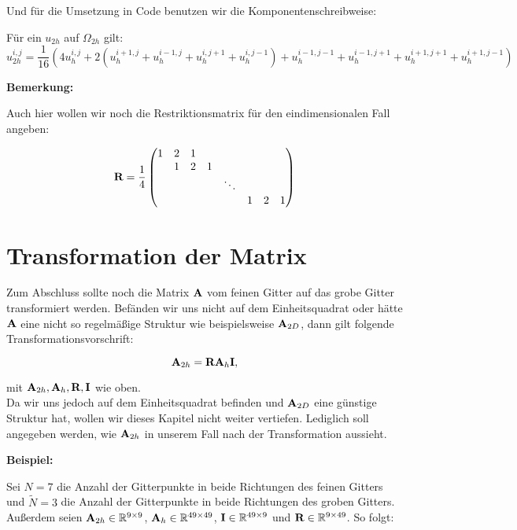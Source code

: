 Und für die Umsetzung in Code benutzen wir die Komponentenschreibweise:

Für ein $u_{2h}$ auf $\Omega_{2h}$ gilt:
\begin{equation}
u_{2h}^{i,j} = \frac {1} {16} (4u_{h}^{i,j}+2(u_{h}^{i+1,j}+u_{h}^{i-1,j}+u_{h}^{i,j+1}+u_{h}^{i,j-1})+u_{h}^{i-1,j-1}+u_{h}^{i-1,j+1}+u_{h}^{i+1,j+1}+u_{h}^{i+1,j-1})
\end{equation}

\textbf{Bemerkung:}

Auch hier wollen wir noch die Restriktionsmatrix für den eindimensionalen Fall angeben:

\begin{equation}
{\textbf{R}} = \frac {1} {4}
\begin{pmatrix}
1 & 2 & 1\\
  & 1 & 2 & 1\\
  &   &   &   & \ddots\\
  &   &   &   &        & 1 & 2 & 1
\end{pmatrix}
\end{equation}

\section{Transformation der Matrix}

Zum Abschluss sollte noch die Matrix ${\textbf{A}}$ vom feinen Gitter auf das grobe Gitter transformiert werden. Befänden wir uns nicht auf dem Einheitsquadrat oder hätte ${\textbf{A}}$ eine nicht so regelmäßige Struktur wie beispielsweise ${\textbf{A}}_{2D}$, dann gilt folgende Transformationsvorschrift:

\begin{equation}
{\textbf{A}}_{2h} = {\textbf{R}}{\textbf{A}}_{h}{\textbf{I}},
\end{equation}

mit ${\textbf{A}}_{2h},{\textbf{A}}_{h},{\textbf{R}},{\textbf{I}}$ wie oben.\\
Da wir uns jedoch auf dem Einheitsquadrat befinden und ${\textbf{A}}_{2D}$ eine günstige Struktur hat, wollen wir dieses Kapitel nicht weiter vertiefen. Lediglich soll angegeben werden, wie ${\textbf{A}}_{2h}$ in unserem Fall nach der Transformation aussieht.

\textbf{Beispiel:}

Sei $N = 7$ die Anzahl der Gitterpunkte in beide Richtungen des feinen Gitters und $\tilde N = 3$ die Anzahl der Gitterpunkte in beide Richtungen des groben Gitters. Außerdem seien ${\textbf{A}}_{2h} \in \mathbb{R}^{9 \times 9}$, ${\textbf{A}}_{h} \in \mathbb{R}^{49 \times 49}$, ${\textbf{I}} \in \mathbb{R}^{49 \times 9}$ und ${\textbf{R}} \in \mathbb{R}^{9 \times 49}$. So folgt:

